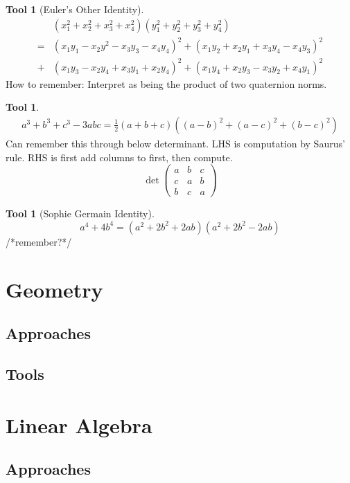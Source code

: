 \documentclass[12pt]{amsart}
\theoremstyle{definition}
\newtheorem{tool}[theorem]{Tool}
\begin{document}
\begin{tool}[Euler's Other Identity]
    \begin{align*}
         &(x_1^2+x_2^2+x_3^2+x_4^2)(y_1^2+y_2^2+y_3^2+y_4^2)\\
        =&(x_1y_1-x_2y^2-x_3y_3-x_4y_4)^2+(x_1y_2+x_2y_1+x_3y_4-x_4y_3)^2\\
        +&(x_1y_3-x_2y_4+x_3y_1+x_2y_4)^2+(x_1y_4+x_2y_3-x_3y_2+x_4y_1)^2
    \end{align*}
    How to remember: Interpret as being the product of two quaternion norms.
\end{tool}
\begin{tool}
    \begin{align*}
        a^3+b^3+c^3-3abc
        =\frac{1}{2}(a+b+c)({(a-b)}^2+{(a-c)}^2+{(b-c)}^2)
    \end{align*}
    Can remember this through below determinant. LHS is computation by
    Saurus' rule. RHS is first add columns to first, then compute.
    \begin{equation*}
    \det\begin{pmatrix} a & b & c \\ c & a & b
        \\ b & c & a \end{pmatrix}
    \end{equation*}
\end{tool}
\begin{tool}[Sophie Germain Identity]
    \begin{equation*}
a^4 + 4b^4 = (a^2 + 2b^2 + 2ab)(a^2 + 2b^2 - 2ab)
    \end{equation*}
    /*remember?*/
\end{tool}
\section{Geometry}
\subsection{Approaches}
\subsection{Tools}
\section{Linear Algebra}
\subsection{Approaches}
\end{document}
